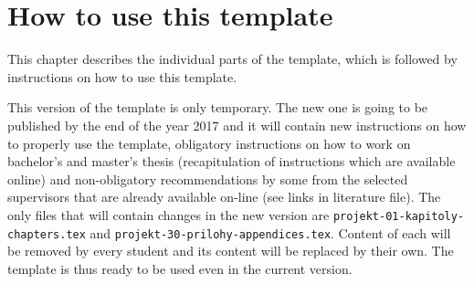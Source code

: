 





\chapter{How to use this template}
\label{how}

This chapter describes the individual parts of the template, which is followed by instructions on how to use this template.

This version of the template is only temporary. The new one is going to be published by the end of the year 2017 and it will contain new instructions on how to properly use the template, obligatory instructions on how to work on bachelor's and master's thesis (recapitulation of instructions which are available online) and non-obligatory recommendations by some from the selected supervisors that are already available on-line (see links in literature file). The only files that will contain changes in the new version are \texttt{projekt-01-kapitoly-chapters.tex} and \texttt{projekt-30-prilohy-appendices.tex}. Content of each will be removed by every student and its content will be replaced by their own. The template is thus ready to be used even in the current version.

